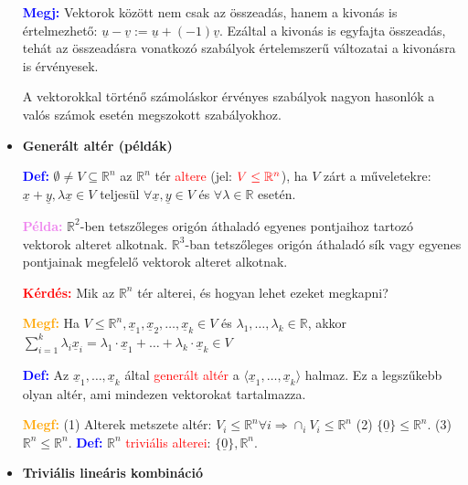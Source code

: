 \documentclass[../../szobeli.tex]{subfiles}
\begin{document}
\begin{itemize}
            \textcolor{blue}{\textbf{Megj:}} Vektorok között nem csak az összeadás, hanem a kivonás is értelmezhető: $\underline{u} - \underline{v} := \underline{u} + (-1) \underline{v}$. Ezáltal a kivonás is egyfajta összeadás, tehát az összeadásra vonatkozó szabályok értelemszerű változatai a kivonásra is érvényesek.

            A vektorokkal történő számoláskor érvényes szabályok nagyon hasonlók a valós számok esetén megszokott szabályokhoz.

        \item \textbf{Generált altér (példák)}
        
            \textcolor{blue}{\textbf{Def:}} $\emptyset \neq V \subseteq \mathbb{R}^n$ az $\mathbb{R}^n$ tér \textcolor{red}{altere} (jel: $\textcolor{red}{V \leq \mathbb{R}^n}$), ha $V$ zárt a műveletekre: $\underline{x} + \underline{y}, \lambda\underline{x} \in V$ teljesül $\forall\underline{x}, \underline{y} \in V$ és $\forall \lambda \in \mathbb{R}$ esetén.

            \textcolor{violet}{\textbf{Példa:}} $\mathbb{R}^2$-ben tetszőleges origón áthaladó egyenes pontjaihoz tartozó vektorok alteret alkotnak. $\mathbb{R}^3$-ban tetszőleges origón áthaladó sík vagy egyenes pontjainak megfelelő vektorok alteret alkotnak.

            \textcolor{red}{\textbf{Kérdés:}} Mik az $\mathbb{R}^n$ tér alterei, és hogyan lehet ezeket megkapni?

            \textcolor{orange}{\textbf{Megf:}} Ha $V \leq \mathbb{R}^n, \underline{x}_1, \underline{x}_2,\dots,\underline{x}_k \in V$ és $\lambda_1, \dots, \lambda_k \in \mathbb{R}$, akkor $\sum_{i=1}^{k} \lambda_i  \underline{x}_i = \lambda_1 \cdot  \underline{x}_1 + \dots + \lambda_k \cdot  \underline{x}_k \in V$

            \textcolor{blue}{\textbf{Def:}} Az $ \underline{x}_1, \dots,  \underline{x}_k$ által \textcolor{red}{generált altér} a $\langle  \underline{x}_1, \dots,  \underline{x}_k\rangle$ halmaz. Ez a legszűkebb olyan altér, ami mindezen vektorokat tartalmazza. 

            \textcolor{orange}{\textbf{Megf:}} (1) Alterek metszete altér: $V_i \leq \mathbb{R}^n \forall i \Rightarrow \cap_i V_i \leq \mathbb{R}^n$ (2) $\{\underline{0}\} \leq \mathbb{R}^n$. (3) $\mathbb{R}^n \leq \mathbb{R}^n$. \textcolor{blue}{\textbf{Def:}} $\mathbb{R}^n$ \textcolor{red}{triviális alterei}: $\{\underline{0}\}, \mathbb{R}^n$.

        \item \textbf{Triviális lineáris kombináció}
        

\end{itemize}
\end{document}
